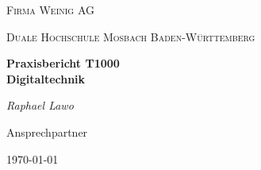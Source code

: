 
\begin{titlepage}
	\thispagestyle{scrheadings}
	\centering	
	\vspace*{3cm}
	{\scshape\LARGE Firma Weinig AG\par}
	\vspace{1cm}
	{\scshape\LARGE Duale Hochschule Mosbach Baden-Württemberg\par}
	\vspace{1.5cm}
	{\large\bfseries Praxisbericht T1000\\ \huge Digitaltechnik\par}
	\vspace{2cm}
	{\Large\itshape Raphael Lawo\par}
	\vfill
	Ansprechpartner\par
	
	\vfill
	
	{\large\today\par}
\end{titlepage}
\newpage
\setcounter{page}{1}
